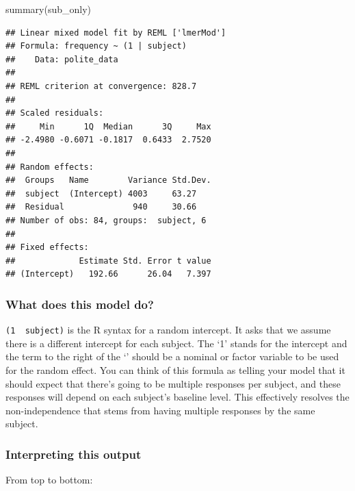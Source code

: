 \documentclass[
  openany]{book}
\newenvironment{Shaded}{\begin{snugshade}}{\end{snugshade}}
\newcommand{\FunctionTok}[1]{\textcolor[rgb]{0.00,0.00,0.00}{#1}}
\newcommand{\NormalTok}[1]{#1}
\begin{document}
\begin{Shaded}
\begin{Highlighting}[]
\FunctionTok{summary}\NormalTok{(sub\_only)}
\end{Highlighting}
\end{Shaded}

\begin{verbatim}
## Linear mixed model fit by REML ['lmerMod']
## Formula: frequency ~ (1 | subject)
##    Data: polite_data
## 
## REML criterion at convergence: 828.7
## 
## Scaled residuals: 
##     Min      1Q  Median      3Q     Max 
## -2.4980 -0.6071 -0.1817  0.6433  2.7520 
## 
## Random effects:
##  Groups   Name        Variance Std.Dev.
##  subject  (Intercept) 4003     63.27   
##  Residual              940     30.66   
## Number of obs: 84, groups:  subject, 6
## 
## Fixed effects:
##             Estimate Std. Error t value
## (Intercept)   192.66      26.04   7.397
\end{verbatim}

\hypertarget{what-does-this-model-do}{%
\subsubsection{What does this model do?}\label{what-does-this-model-do}}

\texttt{(1\ \textbar{}\ subject)} is the R syntax for a random intercept. It asks that we assume there is a different intercept for each subject. The `1' stands for the intercept and the term to the right of the `\textbar{}' should be a nominal or factor variable to be used for the random effect. You can think of this formula as telling your model that it should expect that there's going to be multiple responses per subject, and these responses will depend on each subject's baseline level. This effectively resolves the non-independence that stems from having multiple responses by the same subject.

\hypertarget{interpreting-this-output}{%
\subsubsection{Interpreting this output}\label{interpreting-this-output}}

From top to bottom:
\end{document}
